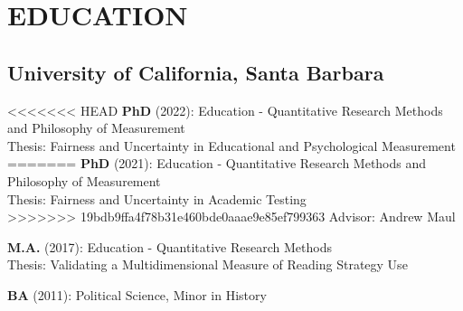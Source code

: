 \documentclass[12pt, oneside,]{memoir}
\begin{document}
\thispagestyle{headers}

\hypertarget{education}{%
\section{EDUCATION}\label{education}}
\hypertarget{university-of-california-santa-barbara}{%
\subsection{University of California, Santa
Barbara}\label{university-of-california-santa-barbara}}
<<<<<<< HEAD
\noindent\textbf{PhD} (2022): Education - Quantitative Research Methods and
Philosophy of Measurement\\
\hspace*{0.333em}\hspace*{0.333em}Thesis: Fairness and Uncertainty in
Educational and Psychological Measurement\\
=======
\noindent\textbf{PhD} (2021): Education - Quantitative Research Methods and
Philosophy of Measurement\\
\hspace*{0.333em}\hspace*{0.333em}Thesis: Fairness and Uncertainty in
Academic Testing\\
>>>>>>> 19bdb9ffa4f78b31e460bde0aaae9e85ef799363
\hspace*{0.333em}\hspace*{0.333em}Advisor: Andrew Maul

\noindent \textbf{M.A.} (2017): Education - Quantitative Research Methods\\
\hspace*{0.333em}\hspace*{0.333em}Thesis: Validating a Multidimensional
Measure of Reading Strategy Use
\vspace{2mm}

\noindent \textbf{BA} (2011): Political Science, Minor in History
\vspace{4mm}
\end{document}
